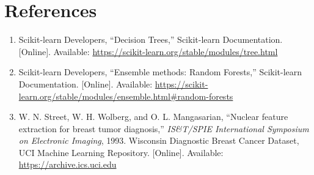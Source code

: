\documentclass[12pt,a4paper]{article}
\begin{document}
\section{References}
\begin{enumerate}
\item Scikit-learn Developers, ``Decision Trees,'' Scikit-learn Documentation.
[Online]. Available: \url{https://scikit-learn.org/stable/modules/tree.html}
\item Scikit-learn Developers, ``Ensemble methods: Random Forests,'' Scikit-learn
Documentation. [Online]. Available:
\url{https://scikit-learn.org/stable/modules/ensemble.html\#random-forests}
\item W. N. Street, W. H. Wolberg, and O. L. Mangasarian, ``Nuclear feature extraction
for breast tumor diagnosis,'' \textit{IS\&T/SPIE International Symposium on Electronic
Imaging}, 1993. Wisconsin Diagnostic Breast Cancer Dataset, UCI Machine Learning
Repository. [Online]. Available: \url{https://archive.ics.uci.edu}
\end{enumerate}
\end{document}

